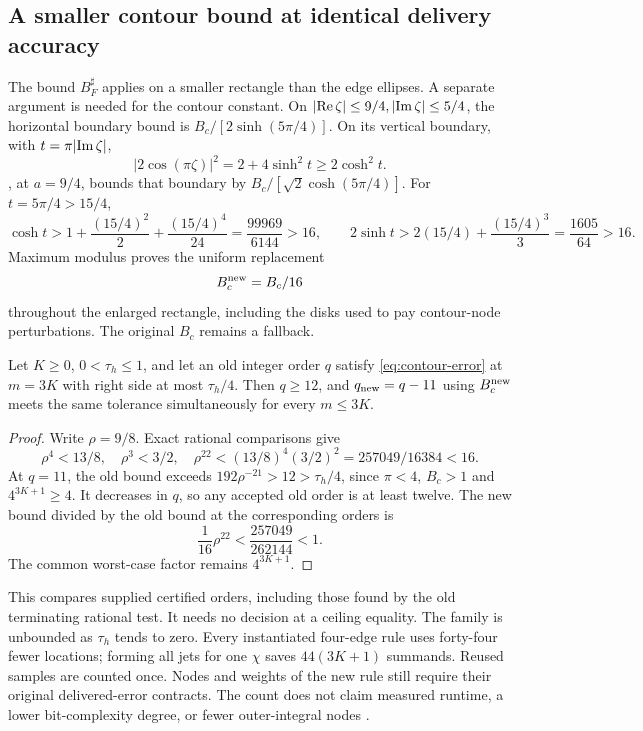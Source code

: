 \subsection{A smaller contour bound at identical delivery accuracy}
\label{subsec:smaller-contour}
The bound \(B_F^\sharp\) applies on a smaller rectangle than the
edge ellipses. A separate argument is needed for the contour constant.
On \(\lvert \operatorname{Re}\zeta\rvert\le9/4,\lvert \operatorname{Im}\zeta\rvert\le5/4\), the
horizontal boundary bound is \(B_c/[2\sinh(5\pi/4)]\).
On its vertical boundary, with \(t=\pi\lvert \operatorname{Im}\zeta\rvert\),
\[
 |2\cos(\pi\zeta)|^2=2+4\sinh^2t\ge2\cosh^2t.
\]
, at \(a=9/4\), bounds that boundary by
\(B_c/[\sqrt2\cosh(5\pi/4)]\). For \(t=5\pi/4>15/4\),
\[
 \cosh t>1+\frac{(15/4)^2}{2}+\frac{(15/4)^4}{24}
       =\frac{99969}{6144}>16,\qquad
 2\sinh t>2(15/4)+\frac{(15/4)^3}{3}=\frac{1605}{64}>16.
\]
Maximum modulus proves the uniform replacement
\begin{equation}
 B_c^{\rm new}=B_c/16
 \label{eq:smaller-contour-constant}
\end{equation}
throughout the enlarged rectangle, including the disks used to pay
contour-node perturbations. The original \(B_c\) remains a fallback.

\begin{proposition}
\label{prop:smaller-contour}
Let \(K\ge0\), \(0<\tau_h\le1\), and let an old integer order
\(q\) satisfy \eqref{eq:contour-error} at \(m=3K\) with right side
at most \(\tau_h/4\). Then \(q\ge12\), and \(q_{\rm new}=q-11\)
using \(B_c^{\rm new}\) meets the same tolerance simultaneously
for every \(m\le3K\).
\end{proposition}
\begin{proof}
Write \(\rho=9/8\). Exact rational comparisons give
\[
 \rho^4<13/8,\quad\rho^3<3/2,\quad
 \rho^{22}<(13/8)^4(3/2)^2=257049/16384<16.
\]
At \(q=11\), the old bound exceeds
\(192\rho^{-21}>12>\tau_h/4\), since \(\pi<4\), \(B_c>1\)
and \(4^{3K+1}\ge4\). It decreases in \(q\), so any accepted
old order is at least twelve. The new bound divided by the old
bound at the corresponding orders is
\[
 \frac1{16}\rho^{22}<\frac{257049}{262144}<1.
\]
The common worst-case factor remains \(4^{3K+1}\).
\end{proof}
This compares supplied certified orders, including those found by
the old terminating rational test. It needs no decision at a ceiling
equality. The family is unbounded as \(\tau_h\) tends to zero.
Every instantiated four-edge rule uses forty-four fewer locations;
forming all jets for one \(\chi\) saves \(44(3K+1)\) summands.
Reused samples are counted once. Nodes and weights of the new rule
still require their original delivered-error contracts. The count
does not claim measured runtime, a lower bit-complexity degree, or
fewer outer-integral nodes \cite{rec18}.

